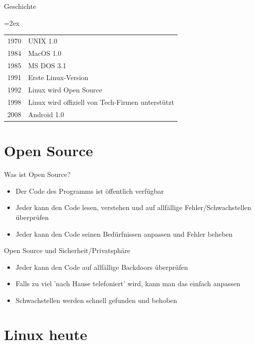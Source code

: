 \documentclass[10pt]{beamer}
\begin{document}
\begin{frame}{Geschichte}
	\centering
	{\tablinesep=2ex\tabcolsep=10pt
		\begin{table}
			\begin{tabular}{r l}
				\toprule
				1970 & UNIX 1.0 \\
				1984 & MacOS 1.0 \\
				1985 & MS DOS 3.1 \\
				1991 & Erste Linux-Version \\
				1992 & Linux wird Open Source \\
				1998 & Linux wird offiziell von Tech-Firmen unterstützt \\
				2008 & Android 1.0 \\
				\bottomrule
			\end{tabular}
		\end{table}
	}
\end{frame}

\section{Open Source}

\begin{frame}{Was ist Open Source?}
	\begin{itemize}[<+- | alert@+>]
		\item Der Code des Programms ist öffentlich verfügbar
		\item Jeder kann den Code lesen, verstehen und auf allfällige Fehler/Schwachstellen überprüfen
		\item Jeder kann den Code seinen Bedürfnissen anpassen und Fehler beheben
	\end{itemize}
\end{frame}

\begin{frame}{Open Source und Sicherheit/Privatsphäre}
	\begin{itemize}[<+- | alert@+>]
		\item Jeder kann den Code auf allfällige Backdoors überprüfen
		\item Falls zu viel 'nach Hause telefoniert' wird, kann man das einfach anpassen
		\item Schwachstellen werden schnell gefunden und behoben
	\end{itemize}
\end{frame}

\section{Linux heute}
\end{document}
